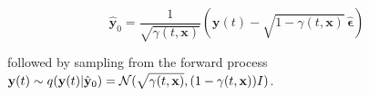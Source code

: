 \begin{equation}
\hat{\mathbf{y}}_{0} = \frac{1}{\sqrt{\gamma(t, \mathbf{x})}} \left( \mathbf{y}(t) - \sqrt{1-\gamma(t, \mathbf{x})} \, \hat{\boldsymbol{\epsilon}} \right)
\end{equation}

followed by sampling from the forward process $\bold{y}(t) \sim q(\bold{y}(t)\lvert\hat{\bold{y}}_{0}) = \mathcal{N}(\sqrt{\gamma(t,\bold{x})},(1-\gamma(t,\bold{x}))I)$. 












